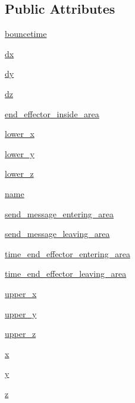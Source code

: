 \subsection*{Public Attributes}
\begin{DoxyCompactItemize}
\item 
\hyperlink{classRET__config_1_1Btn__area_a4b8980abcbbe29171f010fbaf958e5aa}{bouncetime}
\item 
\hyperlink{classRET__config_1_1Btn__area_aacddc911cdfe5cd5ec97b084754542d4}{dx}
\item 
\hyperlink{classRET__config_1_1Btn__area_a22b1a06ae09d552a5ca668a07885ebf1}{dy}
\item 
\hyperlink{classRET__config_1_1Btn__area_a71f0caccd6959b358543ee9cdc9b9c3e}{dz}
\item 
\hyperlink{classRET__config_1_1Btn__area_aef852a503e1c3a4a136a08fb7ccfdf34}{end\+\_\+effector\+\_\+inside\+\_\+area}
\item 
\hyperlink{classRET__config_1_1Btn__area_a253bff6f53fd0cf42fe16fae256db20d}{lower\+\_\+x}
\item 
\hyperlink{classRET__config_1_1Btn__area_abde8ef835f0f5ec35e19a41ea81635b9}{lower\+\_\+y}
\item 
\hyperlink{classRET__config_1_1Btn__area_aafde5bf16bebefaac407edbf1a82be2c}{lower\+\_\+z}
\item 
\hyperlink{classRET__config_1_1Btn__area_ab74e6bf80237ddc4109968cedc58c151}{name}
\item 
\hyperlink{classRET__config_1_1Btn__area_a83a922996b3291335a4a7e12ec0352c5}{send\+\_\+message\+\_\+entering\+\_\+area}
\item 
\hyperlink{classRET__config_1_1Btn__area_a1093600f9685edcc41b8846f856d4575}{send\+\_\+message\+\_\+leaving\+\_\+area}
\item 
\hyperlink{classRET__config_1_1Btn__area_a9187fb0045f227875406717af543604d}{time\+\_\+end\+\_\+effector\+\_\+entering\+\_\+area}
\item 
\hyperlink{classRET__config_1_1Btn__area_ac9034ace22eed6b580e2c01ba5b2e71d}{time\+\_\+end\+\_\+effector\+\_\+leaving\+\_\+area}
\item 
\hyperlink{classRET__config_1_1Btn__area_a5fc95389df55bf4e81e2c0eec403a7ee}{upper\+\_\+x}
\item 
\hyperlink{classRET__config_1_1Btn__area_af3d0698df9e9a8a5fb89a126a503bfbd}{upper\+\_\+y}
\item 
\hyperlink{classRET__config_1_1Btn__area_a5180143a531a7caaefecdd56d378de44}{upper\+\_\+z}
\item 
\hyperlink{classRET__config_1_1Btn__area_a9336ebf25087d91c818ee6e9ec29f8c1}{x}
\item 
\hyperlink{classRET__config_1_1Btn__area_a2fb1c5cf58867b5bbc9a1b145a86f3a0}{y}
\item 
\hyperlink{classRET__config_1_1Btn__area_a25ed1bcb423b0b7200f485fc5ff71c8e}{z}
\end{DoxyCompactItemize}


